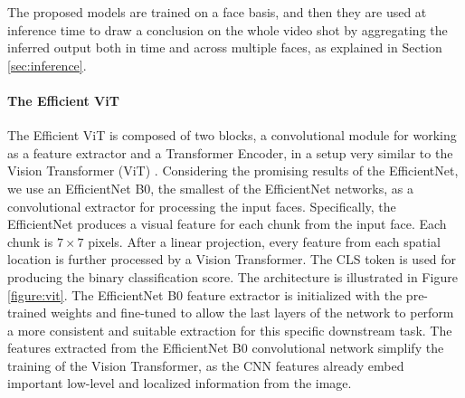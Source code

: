 \documentclass[runningheads]{llncs}
\begin{document}
The proposed models are trained on a face basis, and then they are used at inference time to draw a conclusion on the whole video shot by aggregating the inferred output both in time and across multiple faces, as explained in Section \ref{sec:inference}.

\paragraph{The Efficient ViT}
The Efficient ViT is composed of two blocks, a convolutional module for working as a feature extractor and a Transformer Encoder, in a setup very similar to the Vision Transformer (ViT) \cite{dosovitskiy2020image}.
Considering the promising results of the EfficientNet, we use an EfficientNet B0, the smallest of the EfficientNet networks, as a convolutional extractor for processing the input faces. Specifically, the EfficientNet produces a visual feature for each chunk from the input face. Each chunk is $7\times7$ pixels. After a linear projection, every feature from each spatial location is further processed by a Vision Transformer. The CLS token is used for producing the binary classification score. The architecture is illustrated in Figure \ref{figure:vit}. The EfficientNet B0 feature extractor is initialized with the pre-trained weights and fine-tuned to allow the last layers of the network to perform a more consistent and suitable extraction for this specific downstream task. The features extracted from the EfficientNet B0 convolutional network simplify the training of the Vision Transformer, as the CNN features already embed important low-level and localized information from the image. 
\end{document}
